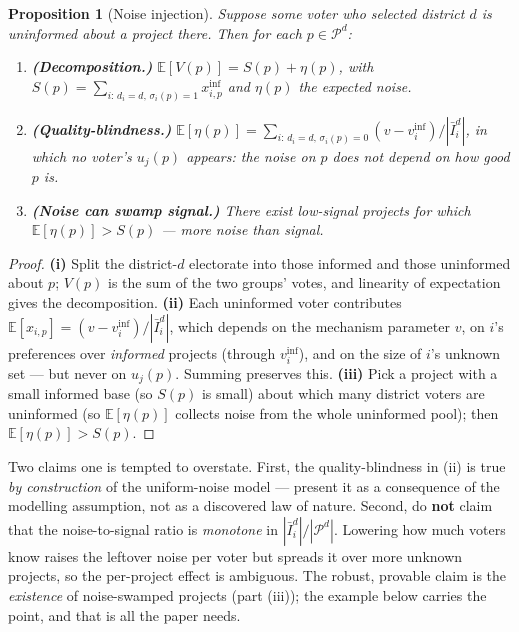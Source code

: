 \documentclass[11pt,letterpaper]{article}
\theoremstyle{definition}
\theoremstyle{plain}
\newtheorem{proposition}{Proposition}[section]
\theoremstyle{remark}
\newcommand{\E}{\mathbb{E}}
\newcommand{\Pset}{\mathcal{P}}
\newcommand{\votes}{v}
\begin{document}
\begin{proposition}[Noise injection]
\label{prop:noise}
Suppose some voter who selected district $d$ is uninformed about a project there. Then for each
$p\in\Pset^d$:
\begin{enumerate}[label=\textup{(\roman*)},nosep]
  \item \textbf{(Decomposition.)} $\E[V(p)]=S(p)+\eta(p)$, with
        $S(p)=\sum_{i:\,d_i=d,\,\sigma_i(p)=1}x_{i,p}^{\text{inf}}$ and $\eta(p)$ the expected
        noise.
  \item \textbf{(Quality-blindness.)}
        $\E[\eta(p)]=\sum_{i:\,d_i=d,\,\sigma_i(p)=0}(\votes-\votes_i^{\text{inf}})/|\bar I_i^d|$,
        in which no voter's $u_j(p)$ appears: the noise on $p$ does not depend on how good $p$ is.
  \item \textbf{(Noise can swamp signal.)} There exist low-signal projects for which
        $\E[\eta(p)]>S(p)$ --- more noise than signal.
\end{enumerate}
\end{proposition}

\begin{proof}
\textbf{(i)} Split the district-$d$ electorate into those informed and those uninformed about $p$;
$V(p)$ is the sum of the two groups' votes, and linearity of expectation gives the decomposition.
\textbf{(ii)} Each uninformed voter contributes
$\E[x_{i,p}]=(\votes-\votes_i^{\text{inf}})/|\bar I_i^d|$, which depends on the mechanism parameter
$\votes$, on $i$'s preferences over \emph{informed} projects (through $\votes_i^{\text{inf}}$), and
on the size of $i$'s unknown set --- but never on $u_j(p)$. Summing preserves this.
\textbf{(iii)} Pick a project with a small informed base (so $S(p)$ is small) about which many
district voters are uninformed (so $\E[\eta(p)]$ collects noise from the whole uninformed pool);
then $\E[\eta(p)]>S(p)$.
\end{proof}

\begin{watchout}
Two claims one is tempted to overstate. First, the quality-blindness in (ii) is true \emph{by
construction} of the uniform-noise model --- present it as a consequence of the modelling
assumption, not as a discovered law of nature. Second, do \textbf{not} claim that the
noise-to-signal ratio is \emph{monotone} in $|\bar I_i^d|/|\Pset^d|$. Lowering how much voters know
raises the leftover noise per voter but spreads it over more unknown projects, so the per-project
effect is ambiguous. The robust, provable claim is the \emph{existence} of noise-swamped projects
(part (iii)); the example below carries the point, and that is all the paper needs.
\end{watchout}
\end{document}
